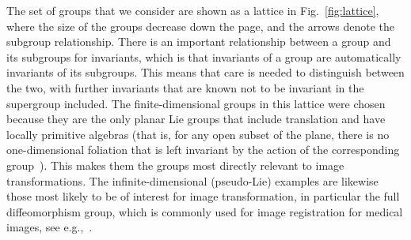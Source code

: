 \documentclass[review,onefignum,onetabnum]{siamonline190516}
\begin{document}
The set of groups that we consider are shown as a lattice in Fig.~\ref{fig:lattice}, where the size of the groups decrease down the page, and the arrows denote the subgroup relationship.  There is an important relationship between a group and its subgroups for invariants, which is that invariants of a group are automatically invariants of its subgroups. This means that care is needed to distinguish between the two, with further invariants that are known not to be invariant in the supergroup included. The finite-dimensional groups in this lattice were chosen because they are the only planar Lie groups that include translation and have locally primitive algebras (that is, for any open subset of the plane, there is no one-dimensional foliation that is left invariant by the action of the corresponding group~\citep{Gonzalez-Lopez90}). This makes them the groups most directly relevant to image transformations. The infinite-dimensional (pseudo-Lie) examples are likewise those most likely to be of interest for image transformation, in particular the full diffeomorphism group, which is commonly used for image registration for medical images, see e.g.,~\citet{YounesBook}.

\end{document}

